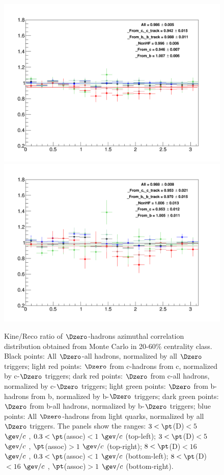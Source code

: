 \begin{figure}
{\includegraphics[width=.48\linewidth]{figuresVsCent/Global/MCClosure/2060/MCClosure_Dzero_Canvas_PtIntBins12to12_PoolInt_thr03to99.png}}
{\includegraphics[width=.48\linewidth]{figuresVsCent/Global/MCClosure/2060/MCClosure_Dzero_Canvas_PtIntBins12to12_PoolInt_thr1to99.png}}
\caption{Kine/Reco ratio of $\Dzero$-hadrons azimuthal correlation distribution obtained from Monte Carlo in 20-60$\%$ centrality class. Black points: All $\Dzero$-all hadrons, normalized by all $\Dzero$ triggers; light red points: $\Dzero$ from c-hadrons from c, normalized by c-$\Dzero$ triggers; dark red points: $\Dzero$ from c-all hadrons, normalized by c-$\Dzero$ triggers; light green points: $\Dzero$ from b-hadrons from b, normalized by b-$\Dzero$ triggers; dark green points: $\Dzero$ from b-all hadrons, normalized by b-$\Dzero$ triggers; blue points: All $\Dzero$-hadrons from light quarks, normalized by all $\Dzero$ triggers.
The panels show the ranges: $3 < \pt$(D)$ < 5$ $\gev/c$ , $0.3 < \pt$(assoc)$ < 1$ $\gev/c$  (top-left); $3 < \pt$(D)$ < 5$ $\gev/c$ , $\pt$(assoc)$ > 1$ $\gev/c$  (top-right); $8 < \pt$(D)$ < 16$ $\gev/c$ , $0.3 < \pt$(assoc)$ < 1$ $\gev/c$  (bottom-left); $8 < \pt$(D)$ < 16$ $\gev/c$ , $\pt$(assoc)$ > 1$ $\gev/c$  (bottom-right).}
\label{fig:MC_Kine_2060}
\end{figure}


